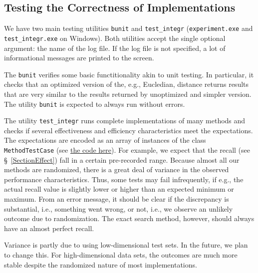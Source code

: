 \documentclass[runningheads,a4paper]{llncs}
\newcommand{\replocdir}{https://github.com/searchivarius/nmslib/tree/v1.5/}
\newcommand{\ttt}[1]{\texttt{#1}}
\begin{document}
{\subsection{Testing the Correctness of Implementations}
We have two main testing utilities \ttt{bunit} and \ttt{test\_integr} (\ttt{experiment.exe} and
\ttt{test\_integr.exe} on Windows).
Both utilities accept the single optional argument: the name of the log file.
If the log file is not specified, a lot of informational messages are printed to the screen.

The \ttt{bunit} verifies some basic functitionality akin to unit testing.
In particular, it checks that an optimized version of the, e.g., Eucledian, distance
returns results that are very similar to the results returned by unoptimized and simpler version.
The utility \ttt{bunit} is expected to always run without errors.

The utility \ttt{test\_integr} runs complete implementations of many methods
and checks if several effectiveness and efficiency characteristics
meet the expectations.
The expectations are encoded as an array of instances of the class \ttt{MethodTestCase}
(see \href{\replocdir similarity_search/test/test_integr.cc#L65}{the code here}).
For example, we expect that the recall (see \S~\ref{SectionEffect})
fall in a certain pre-recorded range.
Because almost all our methods are randomized, there is a great deal of variance
in the observed performance characteristics. Thus, some tests
may fail infrequently, if e.g., the actual recall value is slightly lower or higher 
than an expected minimum  or maximum.
From an error message, it should be clear if the discrepancy is substantial, i.e.,
something went wrong, or not, i.e., we observe an unlikely outcome due to randomization.
The exact search method, however, should always have an almost perfect recall.

Variance is partly due to using low-dimensional test sets. In the future, we plan to change this.
For high-dimensional data sets, the outcomes are much more stable despite the randomized nature
of most implementations.

}
\end{document}
